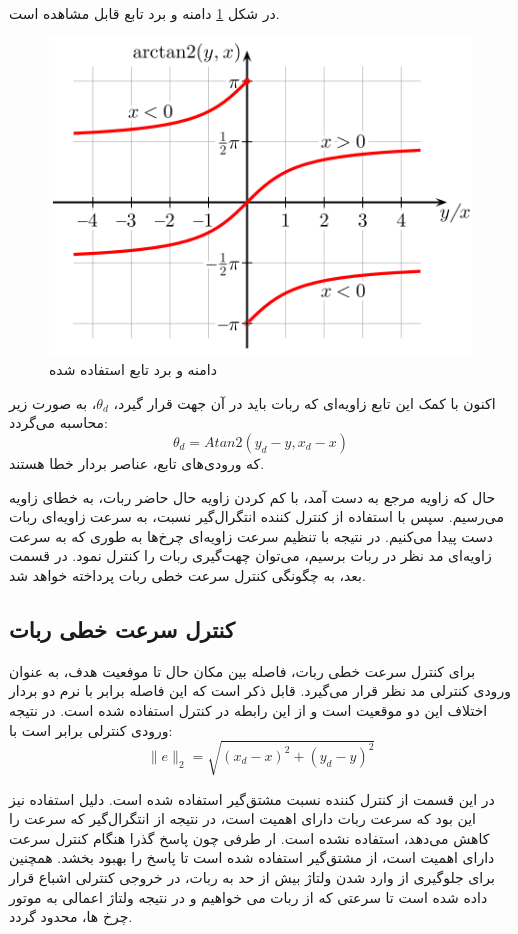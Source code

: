 در شکل \ref{Fig atan2} دامنه و برد تابع  قابل مشاهده است.
\begin{figure}[!h] 
	\centering
	\includegraphics[scale=0.8]{Images/atan2.png}
	\caption{دامنه و برد تابع استفاده شده} \label{Fig atan2}
\end{figure}

اکنون با کمک این تابع زاویه‌ای که ربات باید در آن جهت قرار گیرد، $\theta_d$، به صورت زیر محاسبه می‌گردد:
\begin{equation}
\theta_d = Atan2(y_d - y, x_d - x)
\end{equation}
که ورودی‌های تابع، عناصر بردار خطا هستند.

حال که زاویه مرجع به دست آمد، با کم کردن زاویه حال حاضر ربات، به خطای زاویه می‌رسیم. سپس با استفاده از کنترل کننده انتگرال‌گیر نسبت، به سرعت زاویه‌ای ربات دست پیدا می‌کنیم. در نتیجه با تنظیم سرعت زاویه‌ای چرخ‌ها به طوری که به سرعت زاویه‌ای مد نظر در ربات برسیم، می‌توان چهت‌گیری ربات را کنترل نمود. در قسمت بعد، به چگونگی کنترل سرعت خطی ربات پرداخته خواهد شد. 

\subsection{کنترل سرعت خطی ربات}
برای کنترل سرعت خطی ربات، فاصله بین مکان حال تا موفعیت هدف، به عنوان ورودی کنترلی مد نظر قرار می‌گیرد. قابل ذکر است که این فاصله برابر با نرم دو بردار اختلاف این دو موقعیت است و از این رابطه در کنترل استفاده شده است. در نتیجه ورودی کنترلی برابر است با:
\begin{equation}
\|e\|_2 = \sqrt{(x_d - x)^{2} + (y_d - y)^{2}}
\end{equation}

در این قسمت از کنترل کننده نسبت مشتق‌گیر استفاده شده است. دلیل استفاده نیز این بود که سرعت ربات دارای اهمیت است، در نتیجه از انتگرال‌گیر که سرعت را کاهش می‌دهد، استفاده نشده است. ار طرفی چون پاسخ گذرا هنگام کنترل سرعت دارای اهمیت است، از مشتق‌گیر استفاده شده است تا پاسخ را بهبود بخشد. همچنین برای جلوگیری از وارد شدن ولتاژ بیش از حد به ربات، در خروجی کنترلی اشباع قرار داده شده است تا سرعتی که از ربات می خواهیم و در نتیجه ولتاژ اعمالی به موتور چرخ ها، محدود گردد.

